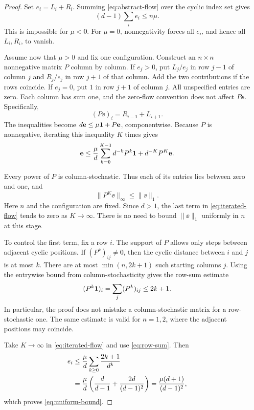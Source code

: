 \begin{proof}
Set $e_i=L_i+R_i$. Summing \eqref{eq:abstract-flow} over the cyclic
index set gives
\begin{equation}\label{eq:total-flow}
 (d-1)\sum_i e_i\le n\mu.
\end{equation}
This is impossible for $\mu<0$. For $\mu=0$, nonnegativity forces
all $e_i$, and hence all $L_i,R_i$, to vanish.

Assume now that $\mu>0$ and fix one configuration. Construct an
$n\times n$ nonnegative matrix $P$ column by column. If $e_j>0$, put
$L_j/e_j$ in row $j-1$ of column $j$ and $R_j/e_j$ in row $j+1$
of that column. Add the two contributions if the rows coincide. If
$e_j=0$, put $1$ in row $j+1$ of column $j$. All unspecified entries
are zero. Each column has sum one, and the zero-flow convention does
not affect $P\ee$. Specifically,
\begin{equation}\label{eq:redistribution}
 (P\ee)_i=R_{i-1}+L_{i+1}.
\end{equation}
The inequalities become $d\mathbf e\le\mu\mathbf 1+P\mathbf e$, componentwise.
Because $P$ is nonnegative, iterating this inequality $K$ times gives
\begin{equation}\label{eq:iterated-flow}
 \mathbf e\le\frac{\mu}{d}\sum_{k=0}^{K-1}d^{-k}P^k\mathbf 1
         +d^{-K}P^K\mathbf e.
\end{equation}

Every power of $P$ is column-stochastic. Thus each of its entries lies
between zero and one, and
\begin{equation}\label{eq:tail-flow}
 \|P^K\ee\|_\infty\le\|\ee\|_1.
\end{equation}
Here $n$ and the configuration are fixed. Since $d>1$, the last term
in \eqref{eq:iterated-flow} tends to zero as $K\to\infty$. There is
no need to bound $\|\ee\|_1$ uniformly in $n$ at this stage.

To control the first term, fix a row $i$. The support of $P$ allows
only steps between adjacent cyclic positions. If $(P^k)_{ij}\ne0$,
then the cyclic distance between $i$ and $j$ is at most $k$. There are
at most $\min(n,2k+1)$ such starting columns $j$. Using the entrywise
bound from column-stochasticity gives the row-sum estimate
\begin{equation}\label{eq:row-sum}
 (P^k\mathbf 1)_i=\sum_j(P^k)_{ij}\le2k+1.
\end{equation}
In particular, the proof does not mistake a column-stochastic matrix
for a row-stochastic one. The same estimate is valid for $n=1,2$,
where the adjacent positions may coincide.

Take $K\to\infty$ in \eqref{eq:iterated-flow} and use
\eqref{eq:row-sum}. Then
\begin{align}
 e_i&\le\frac{\mu}{d}\sum_{k\ge0}\frac{2k+1}{d^k}\notag\\
    &=\frac{\mu}{d}
      \left(\frac{d}{d-1}+\frac{2d}{(d-1)^2}\right)
      =\frac{\mu(d+1)}{(d-1)^2},\label{eq:geometric-flow-bound}
\end{align}
which proves \eqref{eq:uniform-bound}.
\end{proof}

